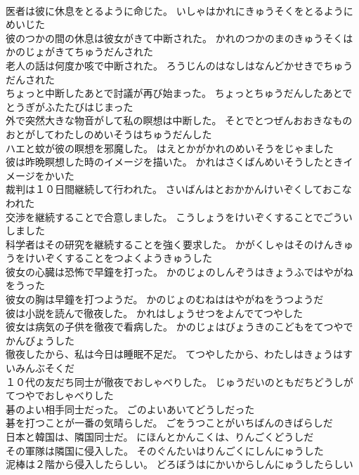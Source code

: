 \documentclass[8pt]{extreport}
\begin{document}
\begin{CJK}{UTF8}{min}
\\	医者は彼に休息をとるように命じた。	いしゃはかれにきゅうそくをとるようにめいじた 
\\	彼のつかの間の休息は彼女がきて中断された。	かれのつかのまのきゅうそくはかのじょがきてちゅうだんされた 
\\	老人の話は何度か咳で中断された。	ろうじんのはなしはなんどかせきでちゅうだんされた 
\\	ちょっと中断したあとで討議が再び始まった。	ちょっとちゅうだんしたあとでとうぎがふたたびはじまった 
\\	外で突然大きな物音がして私の瞑想は中断した。	そとでとつぜんおおきなものおとがしてわたしのめいそうはちゅうだんした 
\\	ハエと蚊が彼の瞑想を邪魔した。	はえとかがかれのめいそうをじゃました 
\\	彼は昨晩瞑想した時のイメージを描いた。	かれはさくばんめいそうしたときイメージをかいた 
\\	裁判は１０日間継続して行われた。	さいばんはとおかかんけいぞくしておこなわれた 
\\	交渉を継続することで合意しました。	こうしょうをけいぞくすることでごういしました 
\\	科学者はその研究を継続することを強く要求した。	かがくしゃはそのけんきゅうをけいぞくすることをつよくようきゅうした 
\\	彼女の心臓は恐怖で早鐘を打った。	かのじょのしんぞうはきょうふではやがねをうった 
\\	彼女の胸は早鐘を打つようだ。	かのじょのむねははやがねをうつようだ 
\\	彼は小説を読んで徹夜した。	かれはしょうせつをよんでてつやした 
\\	彼女は病気の子供を徹夜で看病した。	かのじょはびょうきのこどもをてつやでかんびょうした 
\\	徹夜したから、私は今日は睡眠不足だ。	てつやしたから、わたしはきょうはすいみんぶそくだ 
\\	１０代の友だち同士が徹夜でおしゃべりした。	じゅうだいのともだちどうしがてつやでおしゃべりした 
\\	碁のよい相手同士だった。	ごのよいあいてどうしだった 
\\	碁を打つことが一番の気晴らしだ。	ごをうつことがいちばんのきばらしだ 
\\	日本と韓国は、隣国同士だ。	にほんとかんこくは、りんごくどうしだ 
\\	その軍隊は隣国に侵入した。	そのぐんたいはりんごくにしんにゅうした 
\\	泥棒は２階から侵入したらしい。	どろぼうはにかいからしんにゅうしたらしい 

\end{CJK}
\end{document}
